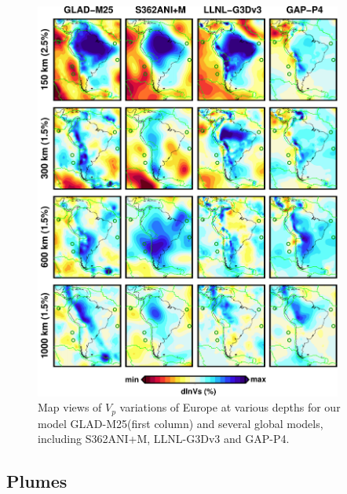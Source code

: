 \documentclass[extra,mreferee]{gji}
\begin{document}
\begin{figure}
\includegraphics[width=0.9\textwidth]{figures/depth_slice/south_america_vp.pdf}
\caption{Map views of $V_p$ variations of Europe at various depths for our model GLAD-M25(first column) and several global models, including S362ANI+M, LLNL-G3Dv3 and GAP-P4.}
\label{fig:global-vp}
\centering
\end{figure}

\subsection{Plumes}
\end{document}
